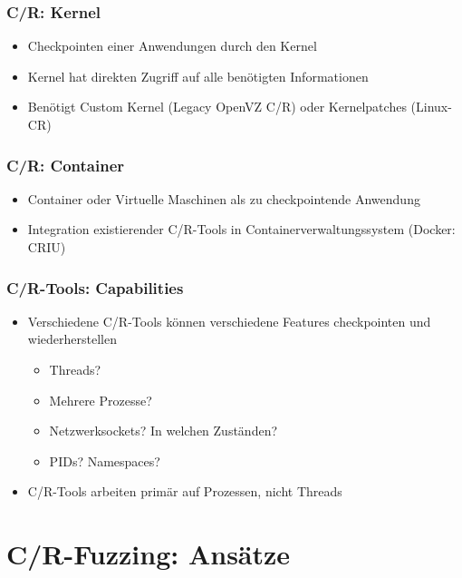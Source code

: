 \documentclass[handout]{beamer}
\begin{document}
\begin{frame}
    \frametitle{C/R: Kernel}
    \begin{itemize}
        \item Checkpointen einer Anwendungen durch den Kernel
        \item Kernel hat direkten Zugriff auf alle benötigten Informationen
        \item Benötigt Custom Kernel (Legacy OpenVZ C/R) oder Kernelpatches (Linux-CR)
    \end{itemize}
\end{frame}

\begin{frame}
    \frametitle{C/R: Container}
    \begin{itemize}
        \item Container oder Virtuelle Maschinen als zu checkpointende Anwendung
        \item Integration existierender C/R-Tools in Containerverwaltungssystem (Docker: CRIU)
    \end{itemize}
\end{frame}

\begin{frame}
    \frametitle{C/R-Tools: Capabilities}
    \begin{itemize}
        \item Verschiedene C/R-Tools können verschiedene Features checkpointen und wiederherstellen
            \begin{itemize}
                \item Threads?
                \item Mehrere Prozesse?
                \item Netzwerksockets? In welchen Zuständen?
                \item PIDs? Namespaces?
            \end{itemize}
        \item C/R-Tools arbeiten primär auf Prozessen, nicht Threads
    \end{itemize}
\end{frame}

\section{C/R-Fuzzing: Ansätze}
\end{document}
